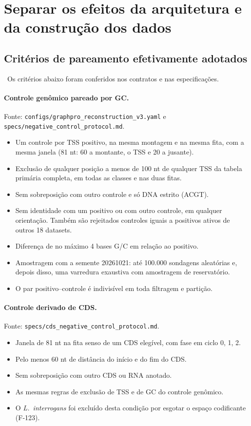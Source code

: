 \documentclass[11pt,a4paper]{article}
\newcommand{\etiqueta}[2]{\tcbox[on line, colback=#1!10, colframe=#1!75!black,
  boxrule=0.4pt, arc=1.2pt, left=1.5pt, right=1.5pt, top=0pt, bottom=0pt,
  fontupper=\sffamily\scriptsize\bfseries]{#2}}
\newcommand{\proj}{\etiqueta{oiGreen}{Projeto}}
\newcommand{\arq}[1]{\nolinkurl{#1}}
\begin{document}
\section{Separar os efeitos da arquitetura e da construção dos dados}
\label{sec:efeitos}

\subsection{Critérios de pareamento efetivamente adotados}
\label{sec:criterios}

\proj\ Os critérios abaixo foram conferidos nos contratos e nas especificações.

\paragraph{Controle genômico pareado por GC.} Fonte: \arq{configs/graphpro_reconstruction_v3.yaml} e \arq{specs/negative_control_protocol.md}.
\begin{itemize}[leftmargin=1.4em]
\item Um controle por TSS positivo, na mesma montagem e na mesma fita, com a mesma janela (81 nt: 60 a montante, o TSS e 20 a jusante).
\item Exclusão de qualquer posição a menos de 100 nt de qualquer TSS da tabela primária completa, em todas as classes e nas duas fitas.
\item Sem sobreposição com outro controle e só DNA estrito (ACGT).
\item Sem identidade com um positivo ou com outro controle, em qualquer orientação. Também são rejeitados controles iguais a positivos ativos de outros 18 datasets.
\item Diferença de no máximo 4 bases G/C em relação ao positivo.
\item Amostragem com a semente 20261021: até 100.000 sondagens aleatórias e, depois disso, uma varredura exaustiva com amostragem de reservatório.
\item O par positivo--controle é indivisível em toda filtragem e partição.
\end{itemize}

\paragraph{Controle derivado de CDS.} Fonte: \arq{specs/cds_negative_control_protocol.md}.
\begin{itemize}[leftmargin=1.4em]
\item Janela de 81 nt na fita senso de um CDS elegível, com fase em ciclo 0, 1, 2.
\item Pelo menos 60 nt de distância do início e do fim do CDS.
\item Sem sobreposição com outro CDS ou RNA anotado.
\item As mesmas regras de exclusão de TSS e de GC do controle genômico.
\item O \emph{L.\ interrogans} foi excluído desta condição por esgotar o espaço codificante (F-123).
\end{itemize}
\end{document}
